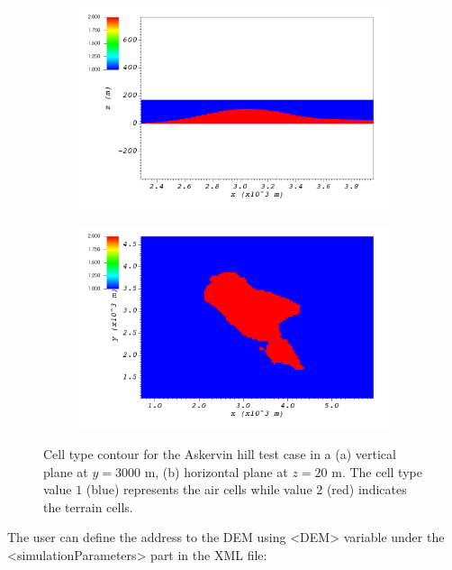 \begin{figure}[H]
    \begin{subfigure}{\textwidth}
    \centering
    \includegraphics[width=13.0cm,keepaspectratio]{Images/askervein_y_3000_icell.png}
    \caption{}
    \end{subfigure}
    \begin{subfigure}{\textwidth}
    \centering
    \includegraphics[width=13.0cm,keepaspectratio]{Images/askervein_z_20_icell.png}
    \caption{}
    \end{subfigure}
    \caption{Cell type contour for the Askervin hill test case in a (a) vertical plane at $y=3000$ m, (b) horizontal plane at $z=20$ m. The cell type value $1$ (blue) represents the air cells while value $2$ (red) indicates the terrain cells.}
\end{figure}

The user can define the address to the DEM using <DEM> variable under the <simulationParameters> part in the XML file:

